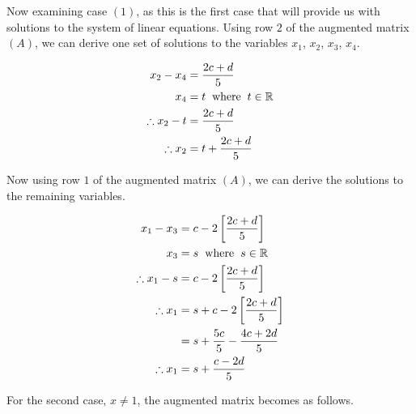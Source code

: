 \documentclass[a4paper]{article}
\begin{document}
\begin{enumerate}[label=\textbf{\arabic*.}]
\begin{enumerate}
				Now examining case $(1)$, as this is the first case that will provide us with solutions to the system of linear equations.
				\bigbreak
				Using row $2$ of the augmented matrix $(A)$, we can derive one set of solutions to the variables $x_1$, $x_2$, $x_3$, $x_4$. 

				\begin{align*}
				x_2 - x_4 & = \frac{2c + d}{5}\\
				x_4 & = t \hspace{2mm} \text{where} \hspace{2mm} t \in \mathbb{R}\\
				\therefore x_2 - t & = \frac{2c + d}{5}\\
				\therefore x_2 & = t + \frac{2c + d}{5}\\
				\end{align*}

				Now using row $1$ of the augmented matrix $(A)$, we can derive the solutions to the remaining variables.

				\begin{align*}
				x_1 - x_3 & = c - 2\left[\frac{2c + d}{5}\right]\\
				x_3 & = s \hspace{2mm} \text{where} \hspace{2mm} s \in \mathbb{R}\\
				\therefore x_1 - s & = c - 2\left[\frac{2c + d}{5}\right]\\
				\therefore x_1 & = s + c - 2\left[\frac{2c + d}{5}\right]\\
				& = s + \frac{5c}{5}-\frac{4c + 2d}{5}\\
				\therefore x_1 & = s + \frac{c - 2d}{5}\\
				\end{align*}

				For the second case, $x \neq 1$, the augmented matrix becomes as follows.


\end{enumerate}
\end{enumerate}
\end{document}
